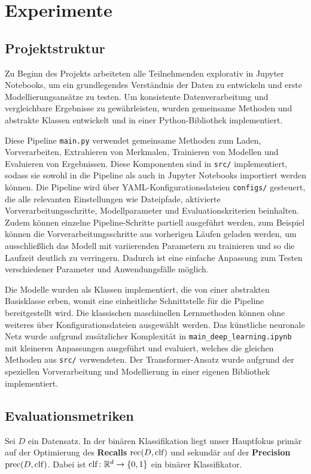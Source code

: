\section{Experimente}

\subsection{Projektstruktur}
\label{sec:projektstruktur}
Zu Beginn des Projekts arbeiteten alle Teilnehmenden explorativ in Jupyter Notebooks, um ein grundlegendes Verständnis der Daten zu entwickeln und erste Modellierungsansätze zu testen. Um konsistente Datenverarbeitung und vergleichbare Ergebnisse zu gewährleisten, wurden gemeinsame Methoden und abstrakte Klassen entwickelt und in einer Python-Bibliothek implementiert.

Diese Pipeline \texttt{main.py} verwendet gemeinsame Methoden zum Laden, Vorverarbeiten, Extrahieren von Merkmalen, Trainieren von Modellen und Evaluieren von Ergebnissen. Diese Komponenten sind in \texttt{src/} implementiert, sodass sie sowohl in die Pipeline als auch in Jupyter Notebooks importiert werden können. Die Pipeline wird über YAML-Konfigurationsdateien \texttt{configs/} gesteuert, die alle relevanten Einstellungen wie Dateipfade, aktivierte Vorverarbeitungsschritte, Modellparameter und Evaluationskriterien beinhalten. Zudem können einzelne Pipeline-Schritte partiell ausgeführt werden, zum Beispiel können die Vorverarbeitungsschritte aus vorherigen Läufen geladen werden, um ausschließlich das Modell mit variierenden Parametern zu trainieren und so die Laufzeit deutlich zu verringern. Dadurch ist eine einfache Anpassung zum Testen verschiedener Parameter und Anwendungsfälle möglich.

Die Modelle wurden als Klassen implementiert, die von einer abstrakten Basisklasse erben, womit eine einheitliche Schnittstelle für die Pipeline bereitgestellt wird. Die klassischen maschinellen Lernmethoden können ohne weiteres über Konfigurationsdateien ausgewählt werden. Das künstliche neuronale Netz wurde aufgrund zusätzlicher Komplexität in \texttt{main\_deep\_learning.ipynb} mit kleineren Anpassungen ausgeführt und evaluiert, welches die gleichen Methoden aus \texttt{src/} verwendeten. Der Transformer-Ansatz wurde aufgrund der speziellen Vorverarbeitung und Modellierung in einer eigenen Bibliothek implementiert.

\subsection{Evaluationsmetriken}
\label{sec:evaluationsmetriken}
Sei $D$ ein Datensatz. In der binären Klassifikation liegt unser Hauptfokus primär auf der Optimierung des \textbf{Recalls} $\operatorname{rec}(D, \operatorname{clf})$ und sekundär auf der \textbf{Precision} $\operatorname{prec}(D, \operatorname{clf})$. Dabei ist $\operatorname{clf}\colon\mathbb{R}^d\to \{0, 1\}$ ein binärer Klassifikator.\\

